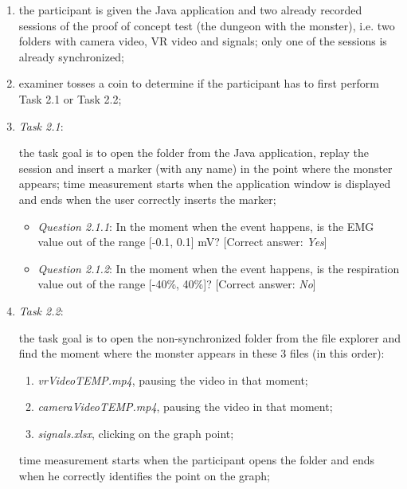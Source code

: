 \documentclass[binding=0.6cm,LaM]{sapthesis}
\begin{document}
\begin{enumerate}

\item the participant is given the Java application and two already recorded sessions of the proof of concept test (the dungeon with the monster), i.e. two folders with camera video, VR video and signals; only one of the sessions is already synchronized;

\item examiner tosses a coin to determine if the participant has to first perform Task 2.1 or Task 2.2;

\item \textit{Task 2.1}:

the task goal is to open the folder from the Java application, replay the session and insert a marker (with any name) in the point where the monster appears; time measurement starts when the application window is displayed and ends when the user correctly inserts the marker;

\begin{itemize}

\item \textit{Question 2.1.1}: In the moment when the event happens, is the EMG value out of the range [-0.1, 0.1] mV? [Correct answer: \textit{Yes}]

\item \textit{Question 2.1.2}: In the moment when the event happens, is the respiration value out of the range [-40\%, 40\%]? [Correct answer: \textit{No}]

\end{itemize}

\item \textit{Task 2.2}: 

the task goal is to open the non-synchronized folder from the file explorer and find the moment where the monster appears in these 3 files (in this order): 
\begin{enumerate}
\item \textit{vrVideo\textunderscore TEMP.mp4}, pausing the video in that moment;
\item \textit{cameraVideo\textunderscore TEMP.mp4}, pausing the video in that moment;
\item \textit{signals.xlsx}, clicking on the graph point;
\end{enumerate}

time measurement starts when the participant opens the folder and ends when he correctly identifies the point on the graph;


\end{enumerate}
\end{document}
